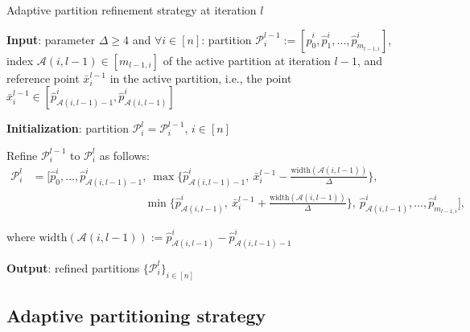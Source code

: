 \documentclass{article}
\begin{document}
\begin{algorithm}[t]
\caption{Adaptive partition refinement strategy at iteration $l$}
\label{alg:adaptive_partitioning}
{
\begin{algorithmic}[1]

\State \textbf{Input}: parameter $\Delta \geq 4$ and $\forall i \in [n]$: partition $\mathcal{P}^{l-1}_i := [\hat{p}^i_0, \hat{p}^i_1, \dots, \hat{p}^i_{m_{l-1,i}}]$, index $\mathcal{A}(i,l-1) \in [m_{l-1,i}]$ of the active partition at iteration $l-1$, and reference point $\bar{x}^{l-1}_i$ in the active partition, i.e., the point $\bar{x}^{l-1}_i \in [\hat{p}^i_{\mathcal{A}(i,l-1)-1}, \hat{p}^i_{\mathcal{A}(i,l-1)}]$

\State \textbf{Initialization}: partition $\mathcal{P}^l_i = \mathcal{P}^{l-1}_i$, $i \in [n]$


\vspace*{0.05in}


\State Refine $\mathcal{P}^{l-1}_i$ to $\mathcal{P}^l_i$ as follows:
\begin{align*}
\mathcal{P}^l_i &= \biggl[ \hat{p}^i_0, \dots, \hat{p}^i_{\mathcal{A}(i,l-1)-1}, \: \max\biggl\{\hat{p}^i_{\mathcal{A}(i,l-1)-1}, \: \bar{x}^{l-1}_i - \frac{\text{width}(\mathcal{A}(i,l-1))}{\Delta}\biggr\}, \\ 
&\qquad\qquad\qquad\qquad\qquad \min\biggl\{\hat{p}^i_{\mathcal{A}(i,l-1)}, \: \bar{x}^{l-1}_i + \frac{\text{width}(\mathcal{A}(i,l-1))}{\Delta}\biggr\}, \: \hat{p}^i_{\mathcal{A}(i,l-1)}, \dots, \hat{p}^i_{m_{l-1,i}} \biggr],
\end{align*}

\Statex \hspace*{0.18in} where $\text{width}(\mathcal{A}(i,l-1)) := \hat{p}^i_{\mathcal{A}(i,l-1)} - \hat{p}^i_{\mathcal{A}(i,l-1)-1}$

\EndFor


\vspace*{0.05in}
\State \textbf{Output}: refined partitions $\{\mathcal{P}^l_i\}_{i \in [n]}$


\end{algorithmic}
}
\end{algorithm}





\subsection{Adaptive partitioning strategy}
\label{sec:alpinepart}
\end{document}
